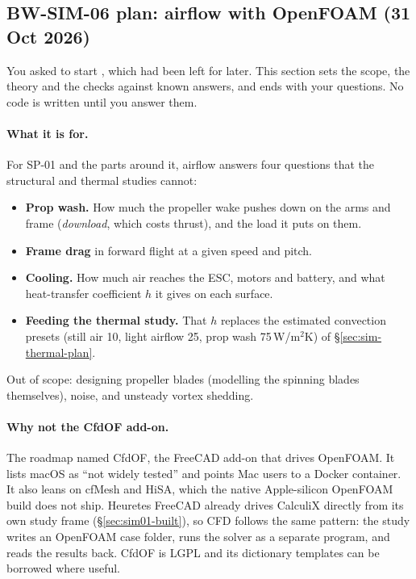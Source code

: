 \subsection{BW-SIM-06 plan: airflow with OpenFOAM (31 Oct 2026)}\label{sec:sim06-plan}

You asked to start , which had been left for later. This section sets the scope, the theory and
the checks against known answers, and ends with your questions. No code is written until you answer them.

\paragraph{What it is for.} For SP-01 and the parts around it, airflow answers four questions that the
structural and thermal studies cannot:
\begin{itemize}[nosep]
  \item \textbf{Prop wash.} How much the propeller wake pushes down on the arms and frame (\emph{download},
        which costs thrust), and the load it puts on them.
  \item \textbf{Frame drag} in forward flight at a given speed and pitch.
  \item \textbf{Cooling.} How much air reaches the ESC, motors and battery, and what heat-transfer coefficient
        $h$ it gives on each surface.
  \item \textbf{Feeding the thermal study.} That $h$ replaces the estimated convection presets (still air 10,
        light airflow 25, prop wash 75\,W/m$^2$K) of \S\ref{sec:sim-thermal-plan}.
\end{itemize}
Out of scope: designing propeller blades (modelling the spinning blades themselves), noise, and unsteady
vortex shedding.

\paragraph{Why not the CfdOF add-on.} The roadmap named CfdOF, the FreeCAD add-on that drives OpenFOAM. It
lists macOS as ``not widely tested'' and points Mac users to a Docker container. It also leans on cfMesh and
HiSA, which the native Apple-silicon OpenFOAM build does not ship. Heuretes FreeCAD already drives CalculiX
directly from its own study frame (\S\ref{sec:sim01-built}), so CFD follows the same pattern: the study writes
an OpenFOAM case folder, runs the solver as a separate program, and reads the results back. CfdOF is LGPL and
its dictionary templates can be borrowed where useful.

